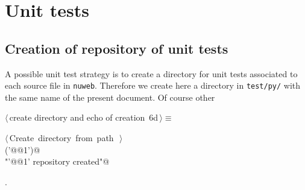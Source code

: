 \documentclass[11pt,oneside]{article}	%
\begin{document}
\section{Unit tests}

\subsection{Creation of repository of unit tests}

A possible unit test strategy is to create a directory for unit tests associated to each source file in \texttt{nuweb}. Therefore we create here a directory in \texttt{test/py/} with the same name of the present document. Of course other 

\begin{flushleft} \small
\begin{minipage}{\linewidth} \label{scrap17}
\protect{}$\langle\,$create directory and echo of creation\nobreak\ {\footnotesize 6d}$\,\rangle\equiv$
\vspace{-1ex}
\begin{list}{}{} \item
\mbox{}\verb@@\hbox{$\langle\,$Create directory from path\nobreak\ {\footnotesize {}}$\,\rangle$}\verb@@\\
\mbox{}\verb@createDir('@@1\verb@')@\\
\mbox{}\verb@print "'@@1\verb@' repository created"@\\
\mbox{}\verb@@{\NWsep}
\end{list}
\vspace{-1ex}
\footnotesize\addtolength{\baselineskip}{-1ex}
\begin{list}{}{\setlength{\itemsep}{-\parsep}\setlength{\itemindent}{-\leftmargin}}
\item {\NWtxtMacroNoRef}.
\end{list}
\end{minipage}\\[4ex]
\end{flushleft}
\end{document}
